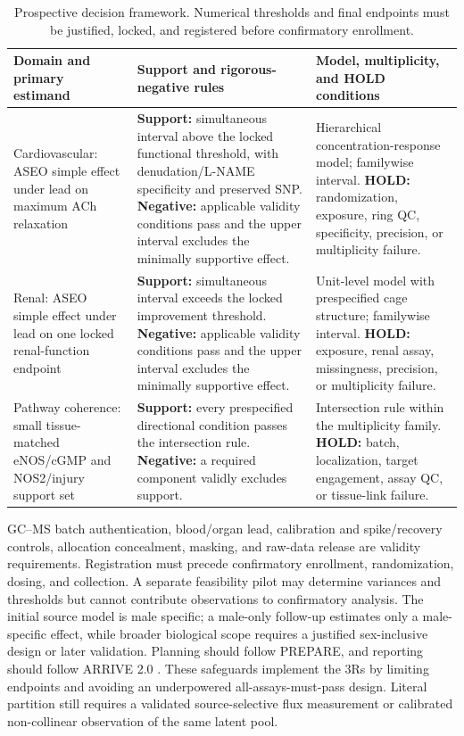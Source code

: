 \documentclass[11pt]{article}
\begin{document}
\begin{table}[htbp]
\centering
\caption{Prospective decision framework. Numerical thresholds and final endpoints must be justified, locked, and registered before confirmatory enrollment.}
\label{tab:decision}
\scriptsize
\begin{tabularx}{\textwidth}{>{\raggedright\arraybackslash}p{}>{\raggedright\arraybackslash}p{}>{\raggedright\arraybackslash}X}
\toprule
Domain and primary estimand & Support and rigorous-negative rules & Model, multiplicity, and HOLD conditions \\
\midrule
Cardiovascular: ASEO simple effect under lead on maximum ACh relaxation & \textbf{Support:} simultaneous interval above the locked functional threshold, with denudation/L-NAME specificity and preserved SNP. \textbf{Negative:} applicable validity conditions pass and the upper interval excludes the minimally supportive effect. & Hierarchical concentration-response model; familywise interval. \textbf{HOLD:} randomization, exposure, ring QC, specificity, precision, or multiplicity failure. \\
Renal: ASEO simple effect under lead on one locked renal-function endpoint & \textbf{Support:} simultaneous interval exceeds the locked improvement threshold. \textbf{Negative:} applicable validity conditions pass and the upper interval excludes the minimally supportive effect. & Unit-level model with prespecified cage structure; familywise interval. \textbf{HOLD:} exposure, renal assay, missingness, precision, or multiplicity failure. \\
Pathway coherence: small tissue-matched eNOS/cGMP and NOS2/injury support set & \textbf{Support:} every prespecified directional condition passes the intersection rule. \textbf{Negative:} a required component validly excludes support. & Intersection rule within the multiplicity family. \textbf{HOLD:} batch, localization, target engagement, assay QC, or tissue-link failure. \\
\bottomrule
\end{tabularx}
\end{table}

GC--MS batch authentication, blood/organ lead, calibration and spike/recovery controls, allocation concealment, masking, and raw-data release are validity requirements. Registration must precede confirmatory enrollment, randomization, dosing, and collection. A separate feasibility pilot may determine variances and thresholds but cannot contribute observations to confirmatory analysis. The initial source model is male specific; a male-only follow-up estimates only a male-specific effect, while broader biological scope requires a justified sex-inclusive design or later validation. Planning should follow PREPARE, and reporting should follow ARRIVE 2.0 \citep{smith2018,arrive2020}. These safeguards implement the 3Rs by limiting endpoints and avoiding an underpowered all-assays-must-pass design. Literal partition still requires a validated source-selective flux measurement or calibrated non-collinear observation of the same latent pool.
\end{document}

